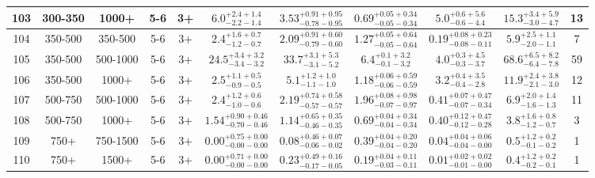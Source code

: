 \documentclass[11pt, oneside]{article}
\begin{document}
\begin{table}
{\begin{tabular}{ |c|c|c|c|c||c|c|c|c||c|c| }
103 & 300-350 & 1000+ & 5-6 & 3+ & $6.0^{+2.4+1.4}_{-2.2-1.4}$ & $3.53^{+0.91+0.95}_{-0.78-0.95}$ & $0.69^{+0.05+0.34}_{-0.05-0.34}$ & $5.0^{+0.6+5.6}_{-0.6-4.4}$ & $15.3^{+3.4+5.9}_{-3.0-4.7}$ & 13 \\ \hline
104 & 350-500 & 350-500 & 5-6 & 3+ & $2.4^{+1.6+0.7}_{-1.2-0.7}$ & $2.09^{+0.91+0.60}_{-0.79-0.60}$ & $1.27^{+0.05+0.64}_{-0.05-0.64}$ & $0.19^{+0.08+0.23}_{-0.08-0.11}$ & $5.9^{+2.5+1.1}_{-2.0-1.1}$ & 7 \\ \hline
105 & 350-500 & 500-1000 & 5-6 & 3+ & $24.5^{+3.4+3.2}_{-3.4-3.2}$ & $33.7^{+3.1+5.3}_{-3.1-5.2}$ & $6.4^{+0.1+3.2}_{-0.1-3.2}$ & $4.0^{+0.3+4.5}_{-0.3-3.7}$ & $68.6^{+6.5+8.2}_{-6.4-7.8}$ & 59 \\ \hline
106 & 350-500 & 1000+ & 5-6 & 3+ & $2.5^{+1.1+0.5}_{-0.9-0.5}$ & $5.1^{+1.2+1.0}_{-1.1-1.0}$ & $1.18^{+0.06+0.59}_{-0.06-0.59}$ & $3.2^{+0.4+3.5}_{-0.4-2.8}$ & $11.9^{+2.4+3.8}_{-2.1-3.0}$ & 12 \\ \hline
107 & 500-750 & 500-1000 & 5-6 & 3+ & $2.4^{+1.2+0.6}_{-1.0-0.6}$ & $2.19^{+0.74+0.58}_{-0.57-0.57}$ & $1.96^{+0.08+0.98}_{-0.07-0.97}$ & $0.41^{+0.07+0.47}_{-0.07-0.34}$ & $6.9^{+2.0+1.4}_{-1.6-1.3}$ & 11 \\ \hline
108 & 500-750 & 1000+ & 5-6 & 3+ & $1.54^{+0.90+0.46}_{-0.70-0.46}$ & $1.14^{+0.65+0.35}_{-0.46-0.35}$ & $0.69^{+0.04+0.34}_{-0.04-0.34}$ & $0.40^{+0.12+0.47}_{-0.12-0.28}$ & $3.8^{+1.6+0.8}_{-1.2-0.7}$ & 3 \\ \hline
109 & 750+ & 750-1500 & 5-6 & 3+ & $0.00^{+0.75+0.00}_{-0.00-0.00}$ & $0.08^{+0.46+0.07}_{-0.06-0.02}$ & $0.39^{+0.04+0.20}_{-0.04-0.20}$ & $0.04^{+0.04+0.06}_{-0.04-0.00}$ & $0.5^{+1.2+0.2}_{-0.1-0.2}$ & 1 \\ \hline
110 & 750+ & 1500+ & 5-6 & 3+ & $0.00^{+0.71+0.00}_{-0.00-0.00}$ & $0.23^{+0.49+0.16}_{-0.17-0.05}$ & $0.19^{+0.04+0.11}_{-0.03-0.11}$ & $0.01^{+0.02+0.02}_{-0.01-0.00}$ & $0.4^{+1.2+0.2}_{-0.2-0.1}$ & 1 \\ \hline
\end{tabular}}
\end{table}
\end{document}
